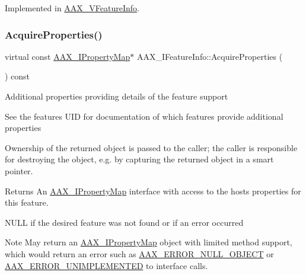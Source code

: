 Implemented in \mbox{\hyperlink{a01917_ad801aa95cc3b8956ca589e28d58acbc7}{A\+A\+X\+\_\+\+V\+Feature\+Info}}.

\mbox{\label{a01829_ab74a4576cd4e87baa01d046dfa0c752e}} 
\subsubsection{\texorpdfstring{AcquireProperties()}{AcquireProperties()}}
{\footnotesize\ttfamily virtual const \mbox{\hyperlink{a01869}{A\+A\+X\+\_\+\+I\+Property\+Map}}$\ast$ A\+A\+X\+\_\+\+I\+Feature\+Info\+::\+Acquire\+Properties (\begin{DoxyParamCaption}{ }\end{DoxyParamCaption}) const\hspace{0.3cm}{\ttfamily [pure virtual]}}

Additional properties providing details of the feature support

See the feature\textquotesingle{}s U\+ID for documentation of which features provide additional properties

Ownership of the returned object is passed to the caller; the caller is responsible for destroying the object, e.\+g. by capturing the returned object in a smart pointer.


\begin{DoxyCode}{0}
\DoxyCodeLine{\textcolor{comment}{// AAX\_IFeatureInfo* featureInfo}}
\end{DoxyCode}


\begin{DoxyReturn}{Returns}
An \mbox{\hyperlink{a01869}{A\+A\+X\+\_\+\+I\+Property\+Map}} interface with access to the host\textquotesingle{}s properties for this feature. 

{\ttfamily N\+U\+LL} if the desired feature was not found or if an error occurred
\end{DoxyReturn}
\begin{DoxyNote}{Note}
May return an \mbox{\hyperlink{a01869}{A\+A\+X\+\_\+\+I\+Property\+Map}} object with limited method support, which would return an error such as \mbox{\hyperlink{a00494_a5f8c7439f3a706c4f8315a9609811937a647cce13fa531e3a46c6eab694048a9c}{A\+A\+X\+\_\+\+E\+R\+R\+O\+R\+\_\+\+N\+U\+L\+L\+\_\+\+O\+B\+J\+E\+CT}} or \mbox{\hyperlink{a00494_a5f8c7439f3a706c4f8315a9609811937a3b76994b32b97fcd56b19ef8032245df}{A\+A\+X\+\_\+\+E\+R\+R\+O\+R\+\_\+\+U\+N\+I\+M\+P\+L\+E\+M\+E\+N\+T\+ED}} to interface calls. 
\end{DoxyNote}


